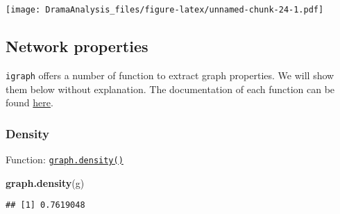 \documentclass[]{book}
\newenvironment{Shaded}{\begin{snugshade}}{\end{snugshade}}
\newcommand{\CommentTok}[1]{\textcolor[rgb]{0.56,0.35,0.01}{\textit{#1}}}
\newcommand{\DataTypeTok}[1]{\textcolor[rgb]{0.13,0.29,0.53}{#1}}
\newcommand{\DecValTok}[1]{\textcolor[rgb]{0.00,0.00,0.81}{#1}}
\newcommand{\FloatTok}[1]{\textcolor[rgb]{0.00,0.00,0.81}{#1}}
\newcommand{\KeywordTok}[1]{\textcolor[rgb]{0.13,0.29,0.53}{\textbf{#1}}}
\newcommand{\NormalTok}[1]{#1}
\newcommand{\OperatorTok}[1]{\textcolor[rgb]{0.81,0.36,0.00}{\textbf{#1}}}
\newcommand{\OtherTok}[1]{\textcolor[rgb]{0.56,0.35,0.01}{#1}}
\newcommand{\StringTok}[1]{\textcolor[rgb]{0.31,0.60,0.02}{#1}}
\begin{document}
\begin{Shaded}
\end{Shaded}

\texttt{[image: DramaAnalysis\_files/figure-latex/unnamed-chunk-24-1.pdf]}

\hypertarget{network-properties}{%
\subsection{Network properties}\label{network-properties}}

\texttt{igraph} offers a number of function to extract graph properties. We will show them below without explanation. The documentation of each function can be found \href{https://igraph.org/r/doc/}{here}.

\hypertarget{density}{%
\subsubsection{Density}\label{density}}

Function: \href{https://igraph.org/r/doc/edge_density.html}{\texttt{graph.density()}}

\begin{Shaded}
\begin{Highlighting}[]
\KeywordTok{graph.density}\NormalTok{(g)}
\end{Highlighting}
\end{Shaded}

\begin{verbatim}
## [1] 0.7619048
\end{verbatim}
\end{document}
